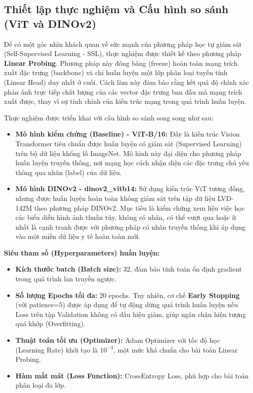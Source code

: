 \subsection{Thiết lập thực nghiệm và Cấu hình so sánh (ViT và DINOv2)}
Để có một góc nhìn khách quan về sức mạnh của phương pháp học tự giám sát (Self-Supervised Learning - SSL), thực nghiệm được thiết kế theo phương pháp \textbf{Linear Probing}. Phương pháp này đóng băng (freeze) hoàn toàn mạng trích xuất đặc trưng (backbone) và chỉ huấn luyện một lớp phân loại tuyến tính (Linear Head) duy nhất ở cuối. Cách làm này đảm bảo rằng kết quả độ chính xác phản ánh trực tiếp chất lượng của các vector đặc trưng ban đầu mà mạng trích xuất được, thay vì sự tinh chỉnh của kiến trúc mạng trong quá trình huấn luyện.

Thực nghiệm được triển khai với cấu hình so sánh song song như sau:
\begin{itemize}
    \item \textbf{Mô hình kiểm chứng (Baseline) - ViT-B/16:} Đây là kiến trúc Vision Transformer tiêu chuẩn được huấn luyện có giám sát (Supervised Learning) trên bộ dữ liệu khổng lồ ImageNet. Mô hình này đại diện cho phương pháp huấn luyện truyền thống, nơi mạng học cách nhận diện các đặc trưng chủ yếu thông qua nhãn (label) của dữ liệu.
    \item \textbf{Mô hình DINOv2 - dinov2\_vitb14:} Sử dụng kiến trúc ViT tương đồng, nhưng được huấn luyện hoàn toàn không giám sát trên tập dữ liệu LVD-142M theo phương pháp DINOv2. Mục tiêu là kiểm chứng xem liệu việc học các biểu diễn hình ảnh thuần túy, không có nhãn, có thể vượt qua hoặc ít nhất là cạnh tranh được với phương pháp có nhãn truyền thống khi áp dụng vào một miền dữ liệu y tế hoàn toàn mới.
\end{itemize}

\textbf{Siêu tham số (Hyperparameters) huấn luyện:}
\begin{itemize}
    \item \textbf{Kích thước batch (Batch size):} 32, đảm bảo tính toán ổn định gradient trong quá trình lan truyền ngược.
    \item \textbf{Số lượng Epochs tối đa:} 20 epochs. Tuy nhiên, cơ chế \textbf{Early Stopping} (với patience=5) được áp dụng để tự động dừng quá trình huấn luyện nếu Loss trên tập Validation không có dấu hiệu giảm, giúp ngăn chặn hiện tượng quá khớp (Overfitting).
    \item \textbf{Thuật toán tối ưu (Optimizer):} Adam Optimizer với tốc độ học (Learning Rate) khởi tạo là $10^{-3}$, một mức khá chuẩn cho bài toán Linear Probing.
    \item \textbf{Hàm mất mát (Loss Function):} CrossEntropy Loss, phù hợp cho bài toán phân loại đa lớp.
\end{itemize}

